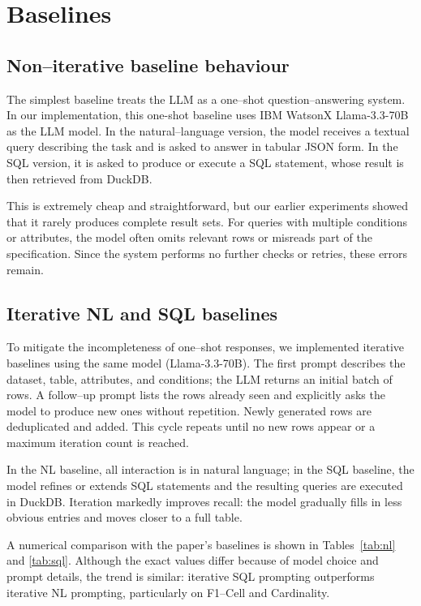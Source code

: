 \documentclass[11pt]{article}
\begin{document}
\clearpage
\section{Baselines}

\subsection{Non–iterative baseline behaviour}

The simplest baseline treats the LLM as a one–shot question–answering system. In our implementation, this one-shot baseline uses IBM WatsonX Llama-3.3-70B as the LLM model. In the natural–language version, the model receives a textual query describing the task and is asked to answer in tabular JSON form. In the SQL version, it is asked to produce or execute a SQL statement, whose result is then retrieved from DuckDB.

This is extremely cheap and straightforward, but our earlier experiments showed that it rarely produces complete result sets. For queries with multiple conditions or attributes, the model often omits relevant rows or misreads part of the specification. Since the system performs no further checks or retries, these errors remain.

\subsection{Iterative NL and SQL baselines}

To mitigate the incompleteness of one–shot responses, we implemented iterative baselines using the same model (Llama-3.3-70B). The first prompt describes the dataset, table, attributes, and conditions; the LLM returns an initial batch of rows. A follow–up prompt lists the rows already seen and explicitly asks the model to produce new ones without repetition. Newly generated rows are deduplicated and added. This cycle repeats until no new rows appear or a maximum iteration count is reached.

In the NL baseline, all interaction is in natural language; in the SQL baseline, the model refines or extends SQL statements and the resulting queries are executed in DuckDB. Iteration markedly improves recall: the model gradually fills in less obvious entries and moves closer to a full table.

A numerical comparison with the paper's baselines is shown in Tables~\ref{tab:nl} and \ref{tab:sql}. Although the exact values differ because of model choice and prompt details, the trend is similar: iterative SQL prompting outperforms iterative NL prompting, particularly on F1–Cell and Cardinality.
\end{document}
